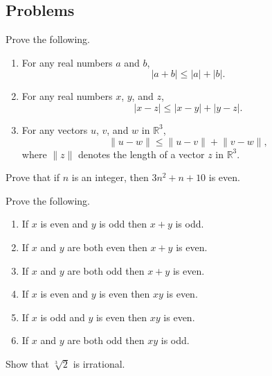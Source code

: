 \documentclass[../notes.tex]{subfiles}
\begin{document}
\subsection{Problems}
\begin{homework}
    Prove the following.
    \begin{enumerate}[label=(\alph*)]
        \item For any real numbers $a$ and $b$,
        \[|a+b|\le|a|+|b|.\]
        \item For any real numbers $x$, $y$, and $z$,
        \[|x-z|\le|x-y|+|y-z|.\]
        \item For any vectors $u$, $v$, and $w$ in $\mathbb R^3$,
        \[\lVert u-w\rVert\le\lVert u-v\rVert+\lVert v-w\rVert,\]
        where $\lVert z\rVert$ denotes the length of a vector $z$ in $\mathbb R^3$.
    \end{enumerate}
\end{homework}

\begin{homework}
    Prove that if $n$ is an integer, then $3n^2 + n + 10$ is even.
\end{homework}

\begin{homework}
    Prove the following.
    \begin{enumerate}[label=(\alph*)]
        \item If $x$ is even and $y$ is odd then $x + y$ is odd.
        \item If $x$ and $y$ are both even then $x + y$ is even.
        \item If $x$ and $y$ are both odd then $x + y$ is even.
        \item If $x$ is even and $y$ is even then $xy$ is even.
        \item If $x$ is odd and $y$ is even then $xy$ is even.
        \item If $x$ and $y$ are both odd then $xy$ is odd.
    \end{enumerate}
\end{homework}

\begin{homework}
    Show that $\sqrt[3]{2}$ is irrational.
\end{homework}
\end{document}
